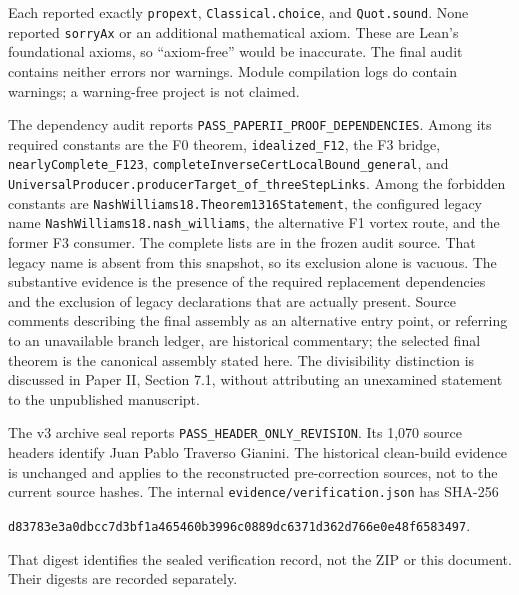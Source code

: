\documentclass[english,11pt,a4paper]{article}
\begin{document}
Each reported exactly \texttt{propext}, \texttt{Classical.\allowbreak{}choice}, and \texttt{Quot.\allowbreak{}sound}. None reported \texttt{sorry\allowbreak{}Ax} or an additional mathematical axiom. These are Lean's foundational axioms, so ``axiom-free'' would be inaccurate. The final audit contains neither errors nor warnings. Module compilation logs do contain warnings; a warning-free project is not claimed.

The dependency audit reports \texttt{PASS\_\allowbreak{}PAPERII\_\allowbreak{}PROOF\_\allowbreak{}DEPENDENCIES}. Among its required constants are the F0 theorem, \texttt{idealized\_\allowbreak{}F12}, the F3 bridge, \texttt{nearly\allowbreak{}Complete\_\allowbreak{}F123}, \texttt{complete\allowbreak{}Inverse\allowbreak{}Cert\allowbreak{}Local\allowbreak{}Bound\_\allowbreak{}general}, and \texttt{Universal\allowbreak{}Producer.\allowbreak{}producer\allowbreak{}Target\_\allowbreak{}of\_\allowbreak{}three\allowbreak{}Step\allowbreak{}Links}. Among the forbidden constants are \texttt{Nash\allowbreak{}Williams18.\allowbreak{}Theorem1316Statement}, the configured legacy name \texttt{Nash\allowbreak{}Williams18.\allowbreak{}nash\_\allowbreak{}williams}, the alternative F1 vortex route, and the former F3 consumer. The complete lists are in the frozen audit source. That legacy name is absent from this snapshot, so its exclusion alone is vacuous. The substantive evidence is the presence of the required replacement dependencies and the exclusion of legacy declarations that are actually present. Source comments describing the final assembly as an alternative entry point, or referring to an unavailable branch ledger, are historical commentary; the selected final theorem is the canonical assembly stated here. The divisibility distinction is discussed in Paper II, Section 7.1, without attributing an unexamined statement to the unpublished manuscript.

The v3 archive seal reports \texttt{PASS\_\allowbreak{}HEADER\_\allowbreak{}ONLY\_\allowbreak{}REVISION}. Its 1,070 source headers identify Juan Pablo Traverso Gianini. The historical clean-build evidence is unchanged and applies to the reconstructed pre-correction sources, not to the current source hashes. The internal \texttt{evidence/\allowbreak{}verification.\allowbreak{}json} has SHA-256

\texttt{d83783e3\allowbreak{}a0dbcc7d\allowbreak{}3bf1a465\allowbreak{}460b3996\allowbreak{}c0889dc6\allowbreak{}371d362d\allowbreak{}766e0e48\allowbreak{}f6583497}.

That digest identifies the sealed verification record, not the ZIP or this document. Their digests are recorded separately.
\end{document}
